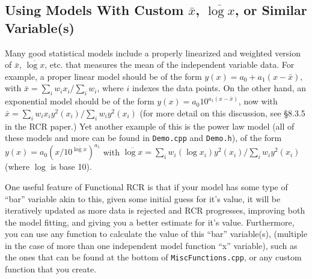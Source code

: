 \documentclass[12pt]{article}
\newcommand{\li}{\lstinline}
\begin{document}
\subsection{Using Models With Custom $\bar{x}$, $\overline{\log x}$, or Similar Variable(s)}
\par Many good statistical models include a properly linearized and weighted version of $\bar{x}$, $\overline{\log x}$, etc. that measures the mean of the independent variable data. For example, a proper linear model should be of the form $y(x) = a_0 + a_1(x-\bar{x})$, with $\bar{x} = \sum_iw_ix_i/\sum_iw_i$, where $i$ indexes the data points. On the other hand, an exponential model should be of the form $y(x) = a_0 10^{a_1(x-\bar{x})}$, now with $\bar{x}=\sum_iw_ix_iy^2(x_i)/\sum_iw_iy^2(x_i)$ (for more detail on this discussion, see \S8.3.5 in the RCR paper.) Yet another example of this is the power law model (all of these models and more can be found in \li{Demo.cpp} and \li{Demo.h}), of the form $y(x) = a_0\left(x/10^{\overline{\log x}}\right)^{a_1}$ with $\overline{\log x} = \sum_iw_i(\log x_i)y^2(x_i)/\sum_iw_iy^2(x_i)$ (where $\log$ is base 10).
\par One useful feature of Functional RCR is that if your model has some type of ``bar'' variable akin to this, given some initial guess for it's value, it will be iteratively updated as more data is rejected and RCR progresses, improving both the model fitting, and giving you a better estimate for it's value. Furthermore, you can use any function to calculate the value of this ``bar'' variable(s), (multiple in the case of more than one independent model function ``x'' variable), such as the ones that can be found at the bottom of \li{MiscFunctions.cpp}, or any custom function that you create.
\end{document}
